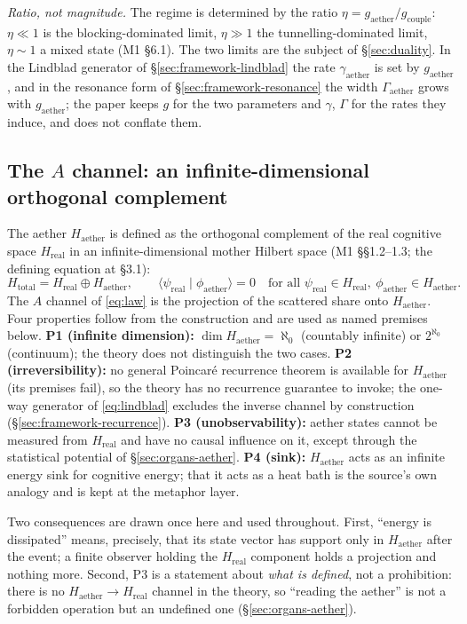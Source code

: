 \documentclass[11pt,a4paper]{article}
\newcommand{\gcouple}{g_{\mathrm{couple}}}
\newcommand{\gaether}{g_{\mathrm{aether}}}
\newcommand{\Haether}{H_{\mathrm{aether}}}
\newcommand{\Hreal}{H_{\mathrm{real}}}
\newcommand{\Htotal}{H_{\mathrm{total}}}
\begin{document}
\emph{Ratio, not magnitude.} The regime is determined by the ratio $\eta = \gaether/\gcouple$: $\eta \ll 1$ is the blocking-dominated limit, $\eta \gg 1$ the tunnelling-dominated limit, $\eta \sim 1$ a mixed state (M1 §6.1). The two limits are the subject of \S\ref{sec:duality}. In the Lindblad generator of \S\ref{sec:framework-lindblad} the rate $\gamma_{\mathrm{aether}}$ is set by $\gaether$, and in the resonance form of \S\ref{sec:framework-resonance} the width $\Gamma_{\mathrm{aether}}$ grows with $\gaether$; the paper keeps $g$ for the two parameters and $\gamma$, $\Gamma$ for the rates they induce, and does not conflate them.

\subsection{The $A$ channel: an infinite-dimensional orthogonal complement}
\label{sec:framework-complement}

The aether $\Haether$ is defined as the orthogonal complement of the real cognitive space $\Hreal$ in an infinite-dimensional mother Hilbert space (M1 §§1.2--1.3; the defining equation at §3.1):
\begin{equation}
\Htotal = \Hreal \oplus \Haether, \qquad
\langle \psi_{\mathrm{real}} \mid \phi_{\mathrm{aether}} \rangle = 0 \quad \text{for all } \psi_{\mathrm{real}} \in \Hreal,\ \phi_{\mathrm{aether}} \in \Haether .
\label{eq:complement}
\end{equation}
The $A$ channel of \eqref{eq:law} is the projection of the scattered share onto $\Haether$. Four properties follow from the construction and are used as named premises below. \textbf{P1 (infinite dimension):} $\dim \Haether = \aleph_0$ (countably infinite) or $2^{\aleph_0}$ (continuum); the theory does not distinguish the two cases. \textbf{P2 (irreversibility):} no general Poincar\'e recurrence theorem is available for $\Haether$ (its premises fail), so the theory has no recurrence guarantee to invoke; the one-way generator of \eqref{eq:lindblad} excludes the inverse channel by construction (\S\ref{sec:framework-recurrence}). \textbf{P3 (unobservability):} aether states cannot be measured from $\Hreal$ and have no causal influence on it, except through the statistical potential of \S\ref{sec:organs-aether}. \textbf{P4 (sink):} $\Haether$ acts as an infinite energy sink for cognitive energy; that it acts as a heat bath is the source's own analogy and is kept at the metaphor layer.

Two consequences are drawn once here and used throughout. First, ``energy is dissipated'' means, precisely, that its state vector has support only in $\Haether$ after the event; a finite observer holding the $\Hreal$ component holds a projection and nothing more. Second, P3 is a statement about \emph{what is defined}, not a prohibition: there is no $\Haether \to \Hreal$ channel in the theory, so ``reading the aether'' is not a forbidden operation but an undefined one (\S\ref{sec:organs-aether}).
\end{document}
